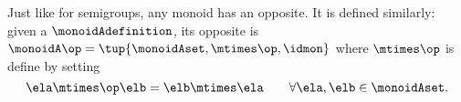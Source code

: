 %
%
%
%

\begin{remark}
    Just like for semigroups, any monoid has an opposite.
    It is defined similarly: given a  $\monoidAdefinition$, its opposite is $\monoidA \op = \tup{ \monoidAset, \mtimes\op, \idmon }$ where $\mtimes\op$ is define by setting
    \begin{equation}
        \ela \mtimes \op \elb = \elb \mtimes \ela \qquad \forall \ela, \elb \in \monoidAset.
    \end{equation}
\end{remark}

